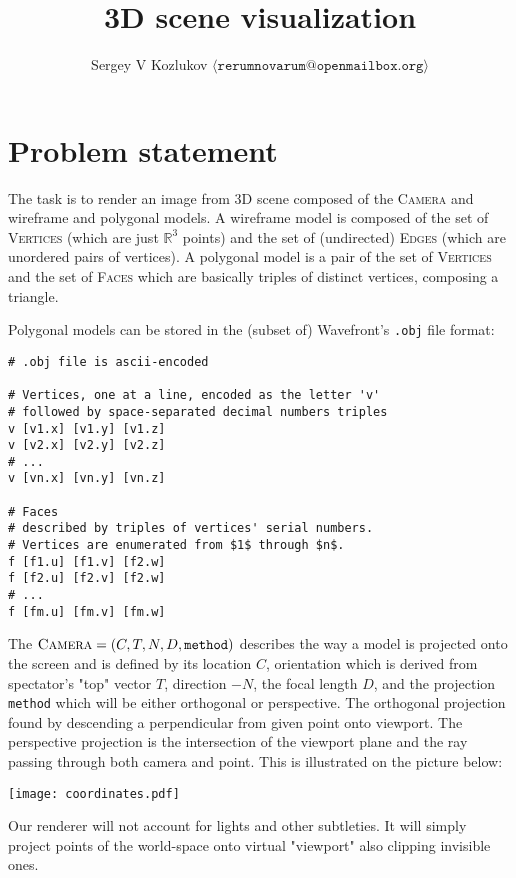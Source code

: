 \documentclass[a4paper]{article}
\title{3D scene visualization}
\author{Sergey V Kozlukov \(\langle\texttt{rerumnovarum@openmailbox.org}\rangle\)}
\begin{document}
\maketitle

\section{Problem statement}
The task is to render an image from 3D scene
composed of the \textsc{Camera} and  wireframe and polygonal models.
A wireframe model is composed of the set of \textsc{Vertices}
(which are just \( \mathbb{R}^3 \) points)
and the set of (undirected) \textsc{Edges} (which are unordered pairs of vertices).
A polygonal model is a pair of the set of \textsc{Vertices} and the set of \textsc{Faces}
which are basically triples of distinct vertices, composing a triangle.

Polygonal models can be stored in the (subset of) Wavefront's \texttt{.obj} file format:

\begin{lstlisting}[frame=single]
# .obj file is ascii-encoded

# Vertices, one at a line, encoded as the letter 'v'
# followed by space-separated decimal numbers triples
v [v1.x] [v1.y] [v1.z]
v [v2.x] [v2.y] [v2.z]
# ...
v [vn.x] [vn.y] [vn.z]

# Faces
# described by triples of vertices' serial numbers.
# Vertices are enumerated from $1$ through $n$.
f [f1.u] [f1.v] [f2.w]
f [f2.u] [f2.v] [f2.w]
# ...
f [fm.u] [fm.v] [fm.w]
\end{lstlisting}

The \( \textsc{Camera} = \left(C,T,N,D,\texttt{method}\right) \)
describes the way a model is projected onto the screen
and is defined by its location \( C \),
orientation which is derived from spectator's "top" vector \( T \),
direction \( -N \),
the focal length \( D \),
and the projection \texttt{method} which will be either orthogonal or perspective.
The orthogonal projection found by descending a perpendicular
from given point onto viewport.
The perspective projection is
the intersection of the viewport plane
and the ray passing through both camera and point.
This is illustrated on the picture below:

\texttt{[image: coordinates.pdf]}

Our renderer will not account for lights and other subtleties.
It will simply project points of the world-space onto virtual "viewport"
also clipping invisible ones.
\end{document}
